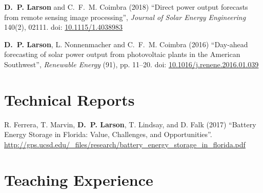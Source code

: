 \documentclass[10pt]{res}
\begin{document}
\begin{resume}


\textbf{D.~P. Larson} and C.~F.~M. Coimbra (2018) ``Direct power output forecasts from remote sensing image processing'', \textit{Journal of Solar Energy Engineering} 140(2), 02111. doi: \href{http://dx.doi.org/10.1115/1.4038983}{10.1115/1.4038983}

\textbf{D.~P. Larson}, L. Nonnenmacher and C.~F.~M. Coimbra (2016) ``Day-ahead forecasting of solar power output from photovoltaic plants in the American Southwest'', \textit{Renewable Energy} (91), pp. 11--20. doi: \href{http://dx.doi.org/10.1016/j.renene.2016.01.039}{10.1016/j.renene.2016.01.039}


%
\section{Technical Reports}
\vspace{0.1in}

R. Ferrera, T. Marvin, \textbf{D.~P. Larson}, T. Lindsay, and D. Falk (2017) ``Battery Energy Storage in Florida: Value, Challenges, and Opportunities''. \url{http://gps.ucsd.edu/_files/research/battery_energy_storage_in_florida.pdf}






\section{Teaching Experience}
\vspace{0.1in}


\end{resume}
\end{document}
